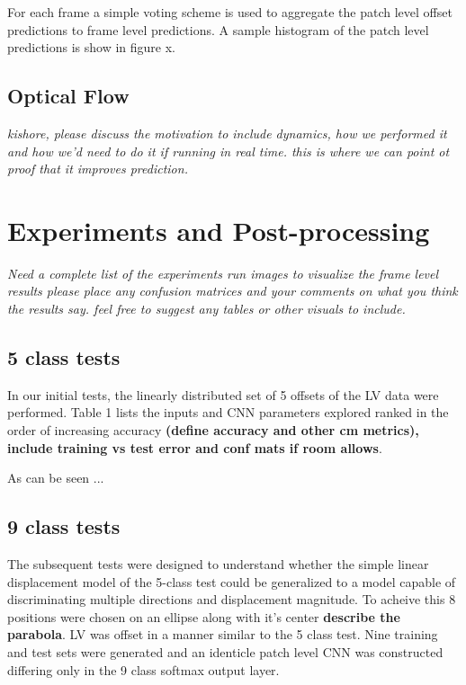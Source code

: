 \documentclass{article}
\begin{document}
For each frame a simple voting scheme is used to aggregate the patch level offset predictions to frame level predictions. A sample histogram of the patch level predictions is show in figure x.


\subsection{Optical Flow} %
\label{sub:optical_flow}
\textit{kishore, please discuss the motivation to include dynamics, how we performed it and how we'd need to do it if running in real time. this is where we can point ot proof that it improves prediction.}



\section{Experiments and Post-processing} %
\label{sec:experiments_and_post_processing}
\textit{Need a complete list of the experiments run
images to visualize the frame level results
please place any confusion matrices and your comments on what you think the results say.
feel free to suggest any tables or other visuals to include.}




\subsection{5 class tests} %
\label{sub:5_class_tests}
In our initial tests, the linearly distributed set of 5 offsets of the LV data were performed. Table 1 lists the inputs and CNN parameters explored ranked in the order of increasing accuracy \textbf{(define accuracy and other cm metrics), include training vs test error and conf mats if room allows}.  

As can be seen ... 


\subsection{9 class tests} %
\label{sub:9_class_tests}
The subsequent tests were designed to understand whether the simple linear displacement model of the 5-class test could be generalized to a model capable of discriminating multiple directions and displacement magnitude. To acheive this 8 positions were chosen on an ellipse along with it's center \textbf{describe the parabola}. LV was offset in a manner similar to the 5 class test. Nine training and test sets were generated and an identicle patch level CNN was constructed differing only in the 9 class softmax output layer. 
\end{document}

